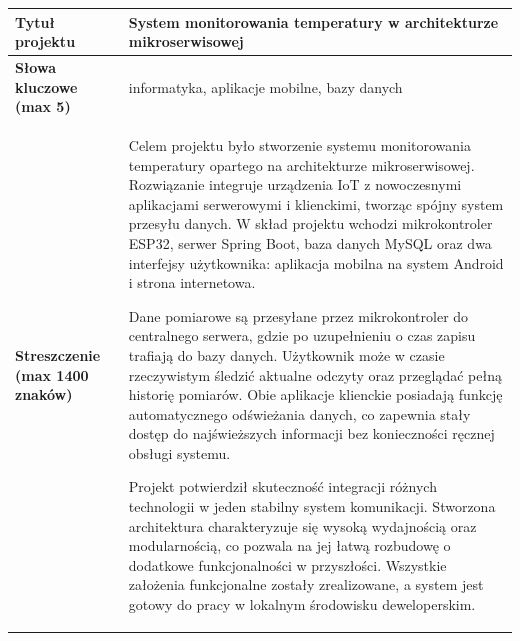 \noindent
\begin{tabular}{|p{5cm}|p{10cm}|}
\hline
\textbf{Tytuł projektu} & System monitorowania temperatury w architekturze mikroserwisowej\\
\hline
\textbf{Słowa kluczowe (max 5)} & informatyka, aplikacje mobilne, bazy danych\\
\hline
\textbf{Streszczenie (max 1400 znaków)} & Celem projektu było stworzenie systemu monitorowania temperatury opartego na architekturze mikroserwisowej. Rozwiązanie integruje urządzenia IoT z nowoczesnymi aplikacjami serwerowymi i klienckimi, tworząc spójny system przesyłu danych. W skład projektu wchodzi mikrokontroler ESP32, serwer Spring Boot, baza danych MySQL oraz dwa interfejsy użytkownika: aplikacja mobilna na system Android i strona internetowa.

Dane pomiarowe są przesyłane przez mikrokontroler do centralnego serwera, gdzie po uzupełnieniu o czas zapisu trafiają do bazy danych. Użytkownik może w czasie rzeczywistym śledzić aktualne odczyty oraz przeglądać pełną historię pomiarów. Obie aplikacje klienckie posiadają funkcję automatycznego odświeżania danych, co zapewnia stały dostęp do najświeższych informacji bez konieczności ręcznej obsługi systemu.

Projekt potwierdził skuteczność integracji różnych technologii w jeden stabilny system komunikacji. Stworzona architektura charakteryzuje się wysoką wydajnością oraz modularnością, co pozwala na jej łatwą rozbudowę o dodatkowe funkcjonalności w przyszłości. Wszystkie założenia funkcjonalne zostały zrealizowane, a system jest gotowy do pracy w lokalnym środowisku deweloperskim.\\
\hline
\end{tabular}

\vspace{1.5cm}
